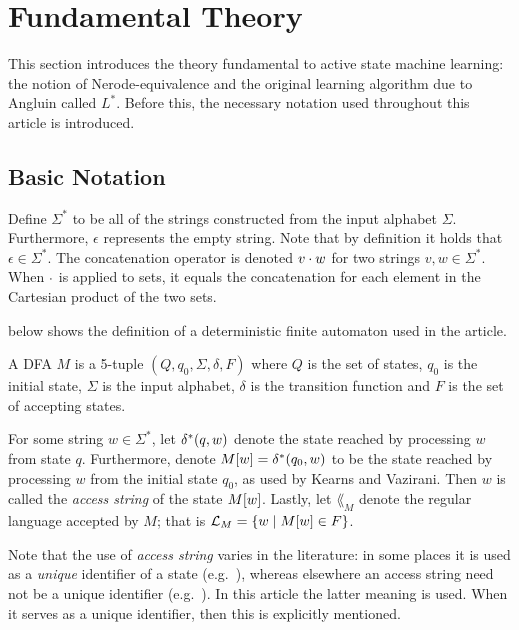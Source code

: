 \section{Fundamental Theory}
\label{sec:fundamental-theory}
This section introduces the theory fundamental to active state machine learning:
the notion of Nerode-equivalence and the original learning algorithm due to
Angluin called $L^*$\cite{Angluin1987}. Before this, the necessary notation used
throughout this article is introduced.

\subsection{Basic Notation}
\label{sec:basic-notation}

Define $\Sigma^*$ to be all of the strings constructed from the input alphabet
$\Sigma$. Furthermore, $\epsilon$ represents the empty string. Note that by
definition it holds that $\epsilon \in \Sigma^*$. The concatenation operator is
denoted $v \cdot w$ for two strings $v,w \in \Sigma^*$. When $\cdot$ is
applied to sets, it equals the concatenation for each element in the Cartesian
product of the two sets.

 below shows the definition of a deterministic finite automaton
used in the article.

\begin{definition}\label{def:dfa}
  A DFA $M$ is a 5-tuple $(Q, q_0, \Sigma, \delta, F)$ where $Q$ is the set of
  states, $q_0$ is the initial state, $\Sigma$ is the input alphabet, $\delta$
  is the transition function and $F$ is the set of accepting states.
\end{definition}

For some string $w \in \Sigma^*$, let $\delta^*(q,w)$ denote the state reached by
processing $w$ from state $q$. Furthermore, denote
$M[w] = \delta^*(q_0,w)$ to be the state reached by processing $w$ from
the initial state $q_0$, as used by Kearns and Vazirani\cite{Kearns1994}. Then
$w$ is called the \textit{access string} of the state $M[w]$. Lastly, let
$\lang_M$ denote the regular language accepted by $M$; that is
$\mathcal{L}_M = \{ w \mid M[w] \in F \}$.

Note that the use of \textit{access string} varies in the literature: in some
places it is used as a \textit{unique} identifier of a state
(e.g.~\cite{Isberner2015a,Isberner2014a}), whereas elsewhere an access string
need not be a unique identifier (e.g.~\cite{Howar2014}). In this article the
latter meaning is used. When it serves as a unique identifier, then this is
explicitly mentioned.

